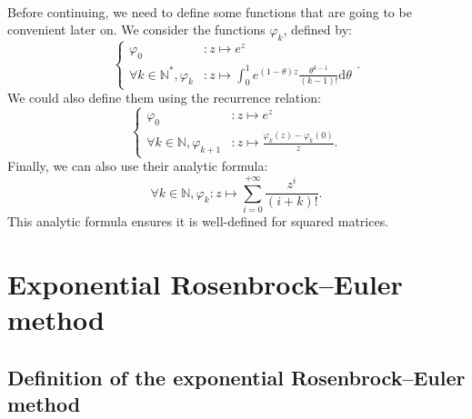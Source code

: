     \paragraph{}
    Before continuing, we need to define some functions that are going to be convenient later on.
    We consider the functions $\varphi_k$, defined by:
    \begin{equation}
      \left\{\begin{aligned}
        \varphi_0 &: z \mapsto e^z \\
        \forall k \in \mathbb{N}^*, \varphi_{k} &: z \mapsto \int_0^1 e^{\left(1 - \theta\right)z} \frac{\theta^{k-1}}{\left(k-1\right)!} \mathrm{d}\theta
      \end{aligned}\right. .
    \end{equation}
    We could also define them using the recurrence relation:
    \begin{equation}
      \left\{\begin{aligned}
        \varphi_0 &: z \mapsto e^z \\
        \forall k \in \mathbb{N}, \varphi_{k+1} &: z \mapsto \frac{\varphi_k\left(z\right) - \varphi_k\left(0\right)}{z} .
      \end{aligned}\right.
    \end{equation}
    Finally, we can also use their analytic formula:
    \begin{equation}
      \forall k \in \mathbb{N}, \varphi_{k} : z \mapsto \sum_{i = 0}^{+\infty} \frac{z^i}{\left(i + k\right)!} .
    \end{equation}
    This analytic formula ensures it is well-defined for squared matrices.


  \section{Exponential Rosenbrock--Euler method}

    \subsection{Definition of the exponential Rosenbrock--Euler method}


